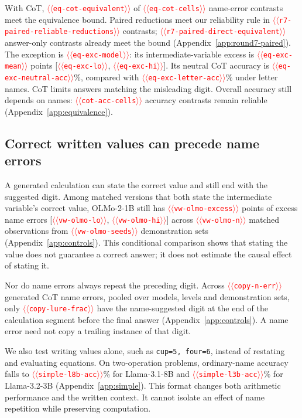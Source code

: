\documentclass[11pt]{article}
\providecommand{\NUM}[1]{\textcolor{red}{$\langle\langle$\texttt{#1}$\rangle\rangle$}}
\begin{document}
With CoT, \NUM{eq-cot-equivalent} of \NUM{eq-cot-cells} name-error contrasts meet the equivalence
bound. Paired reductions meet our reliability rule in \NUM{r7-paired-reliable-reductions} contrasts;
\NUM{r7-paired-direct-equivalent} answer-only contrasts already meet the bound
(Appendix~\ref{app:round7-paired}). The exception is \NUM{eq-exc-model}: its intermediate-variable excess is
\NUM{eq-exc-mean} points [\NUM{eq-exc-lo}, \NUM{eq-exc-hi}]. Its neutral CoT accuracy is
\NUM{eq-exc-neutral-acc}\%, compared with \NUM{eq-exc-letter-acc}\% under letter names.
CoT limits answers matching the misleading digit. Overall accuracy still depends on names:
\NUM{cot-acc-cells} accuracy contrasts remain reliable
(Appendix~\ref{app:equivalence}).





\subsection{Correct written values can precede name errors}
\label{sec:written-controls}

A generated calculation can state the correct value and still end with the suggested
digit. Among matched versions that both state the intermediate variable's correct value,
OLMo-2-1B still has \NUM{vw-olmo-excess} points of excess name errors
[\NUM{vw-olmo-lo}, \NUM{vw-olmo-hi}] across \NUM{vw-olmo-n} matched observations from
\NUM{vw-olmo-seeds} demonstration sets (Appendix~\ref{app:controls}). This conditional
comparison shows that stating the value does not guarantee a correct answer; it does
not estimate the causal effect of stating it.

Nor do name errors always repeat the preceding digit. Across \NUM{copy-n-err} generated
CoT name errors, pooled over models, levels and demonstration sets, only
\NUM{copy-lure-frac} have the name-suggested digit at the end of the calculation segment
before the final answer (Appendix~\ref{app:controls}). A name error need not copy a trailing
instance of that digit.

We also test writing values alone, such as \texttt{cup=5, four=6}, instead of restating
and evaluating equations. On two-operation problems, ordinary-name accuracy falls to
\NUM{simple-l8b-acc}\% for Llama-3.1-8B and \NUM{simple-l3b-acc}\% for Llama-3.2-3B
(Appendix~\ref{app:simple}). This format changes both arithmetic performance and the
written context. It cannot isolate an effect of name repetition while preserving computation.
\end{document}
